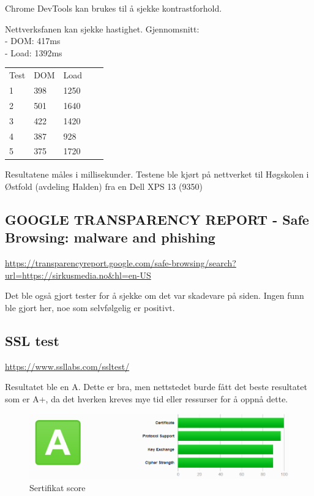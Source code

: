 Chrome DevTools kan brukes til å sjekke kontrastforhold.

Nettverksfanen kan sjekke hastighet.
Gjennomsnitt:\\
- DOM: 417ms\\
- Load: 1392ms

\begin{table}[H]
\begin{tabular}{lllll}
Test & DOM & Load &  &  \\
1 & 398 & 1250 &  &  \\
2 & 501 & 1640 &  &  \\
3 & 422 & 1420 &  &  \\
4 & 387 &  928 &  &  \\
5 & 375 & 1720 &  & 
\end{tabular}
\end{table}

Resultatene måles i millisekunder. Testene ble kjørt på nettverket til Høgskolen i Østfold (avdeling Halden) fra en Dell XPS 13 (9350)

\subsection{GOOGLE TRANSPARENCY REPORT - Safe Browsing: malware and phishing}
\url{https://transparencyreport.google.com/safe-browsing/search?url=https://sirkusmedia.no&hl=en-US}

Det ble også gjort tester for å sjekke om det var skadevare på siden.
Ingen funn ble gjort her, noe som selvfølgelig er positivt.

\subsection{SSL test}

\url{https://www.ssllabs.com/ssltest/}

Resultatet ble en A. Dette er bra, men nettstedet burde fått det beste resultatet som er A+, da det hverken kreves mye tid eller ressurser for å oppnå dette.

\begin{figure}[H]
    \centering
    \includegraphics[width=\textwidth]{bjornar/ssllabs.png}
    \caption{Sertifikat score}
    \label{fig:analysis-current-ssl}
\end{figure}

\clearpage